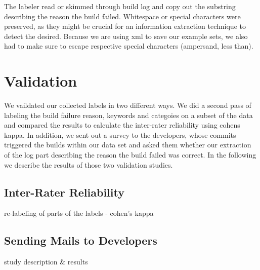 \documentclass[\myrootdir/main.tex]{subfiles}
\begin{document}
The labeler read or skimmed through build log and copy out the substring describing the reason the build failed. Whitespace or special characters were preserved, as they might be crucial for an information extraction technique to detect the desired.
Because we are using xml to save our example sets, we also had to make sure to escape respective special characters (ampersand, less than).


\section{Validation}
We vaildated our collected labels in two different ways. We did a second pass of labeling the build failure reason, keywords and categoies on a subset of the data and compared the results to calculate the inter-rater reliability using cohens kappa. In addition, we sent out a survey to the developers, whose commits triggered the builds within our data set and asked them whether our extraction of the log part describing the reason the build failed was correct. In the following we describe the results of those two validation studies.

\subsection{Inter-Rater Reliability}
re-labeling of parts of the labels - cohen's kappa

\subsection{Sending Mails to Developers}
study description \& results
\end{document}
